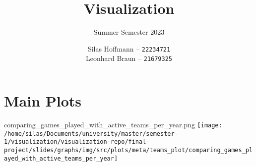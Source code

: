 \documentclass[pdf]{beamer}
\title{Visualization}
\subtitle{Summer Semester 2023}
\author{
    Silas Hoffmann --
    \texttt{22234721} \\
    Leonhard Braun --
    \texttt{21679325} \\
}
\institute{Georg-August-Universität Göttingen}
\begin{document}
\maketitle

\section{Main Plots}
\begin{frame}{comparing\_games\_played\_with\_active\_teams\_per\_year.png}
	\centering
	\texttt{[image: /home/silas/Documents/university/master/semester-1/visualization/visualization-repo/final-project/slides/graphs/img/src/plots/meta/teams\_plot/comparing\_games\_played\_with\_active\_teams\_per\_year]}
\end{frame}
\end{document}
